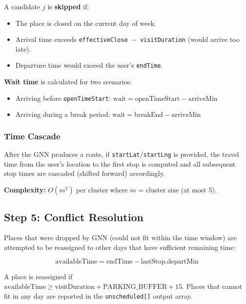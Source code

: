\documentclass[12pt,a4paper]{report}
\begin{document}
A candidate $j$ is \textbf{skipped} if:
\begin{itemize}
    \item The place is closed on the current day of week.
    \item Arrival time exceeds \texttt{effectiveClose $-$ visitDuration} (would arrive too late).
    \item Departure time would exceed the user's \texttt{endTime}.
\end{itemize}

\textbf{Wait time} is calculated for two scenarios:
\begin{itemize}
    \item Arriving before \texttt{openTimeStart}: $\text{wait} = \text{openTimeStart} - \text{arriveMin}$
    \item Arriving during a break period: $\text{wait} = \text{breakEnd} - \text{arriveMin}$
\end{itemize}

\subsubsection{Time Cascade}
After the GNN produces a route, if \texttt{startLat}/\texttt{startLng} is provided, the travel time from the user's location to the first stop is computed and all subsequent stop times are cascaded (shifted forward) accordingly.

\textbf{Complexity:} $O(m^2)$ per cluster where $m$ = cluster size (at most 5).

\subsection{Step 5: Conflict Resolution}

Places that were dropped by GNN (could not fit within the time window) are attempted to be reassigned to other days that have sufficient remaining time:

\begin{equation}
\text{availableTime} = \text{endTime} - \text{lastStop.departMin}
\end{equation}

A place is reassigned if $\text{availableTime} \geq \text{visitDuration} + \text{PARKING\_BUFFER} + 15$. Places that cannot fit in any day are reported in the \texttt{unscheduled[]} output array.

\end{document}
